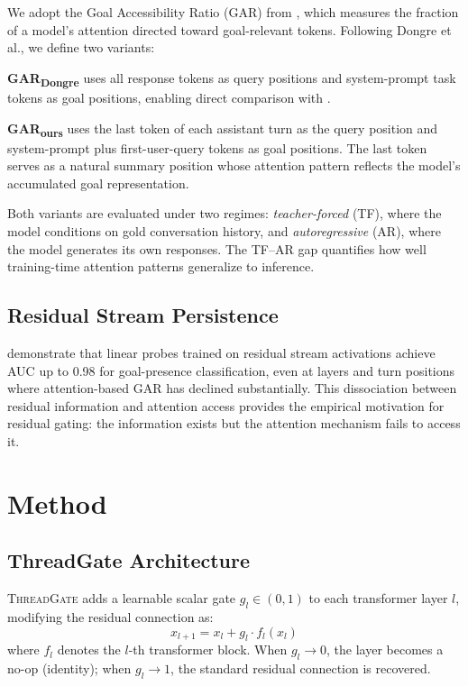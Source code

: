 \documentclass[11pt]{article}
\newcommand{\gar}{\textsc{GAR}}
\newcommand{\garours}{\textsc{GAR}\textsubscript{ours}}
\newcommand{\gardongre}{\textsc{GAR}\textsubscript{Dongre}}
\newcommand{\tg}{\textsc{ThreadGate}}
\begin{document}
We adopt the Goal Accessibility Ratio (\gar{}) from \citet{dongre2026goal}, which measures the fraction of a model's attention directed toward goal-relevant tokens. Following Dongre et al., we define two variants:

\textbf{\gardongre{}} uses all response tokens as query positions and system-prompt task tokens as goal positions, enabling direct comparison with \citet{dongre2026goal}.

\textbf{\garours{}} uses the last token of each assistant turn as the query position and system-prompt plus first-user-query tokens as goal positions. The last token serves as a natural summary position whose attention pattern reflects the model's accumulated goal representation.

Both variants are evaluated under two regimes: \textit{teacher-forced} (TF), where the model conditions on gold conversation history, and \textit{autoregressive} (AR), where the model generates its own responses. The TF--AR gap quantifies how well training-time attention patterns generalize to inference.

\subsection{Residual Stream Persistence}

\citet{dongre2026goal} demonstrate that linear probes trained on residual stream activations achieve AUC up to 0.98 for goal-presence classification, even at layers and turn positions where attention-based \gar{} has declined substantially. This dissociation between residual information and attention access provides the empirical motivation for residual gating: the information exists but the attention mechanism fails to access it.

\section{Method}

\subsection{ThreadGate Architecture}

\tg{} adds a learnable scalar gate $g_l \in (0,1)$ to each transformer layer $l$, modifying the residual connection as:
\begin{equation}
    x_{l+1} = x_l + g_l \cdot f_l(x_l)
\label{eq:gate}
\end{equation}
where $f_l$ denotes the $l$-th transformer block. When $g_l \to 0$, the layer becomes a no-op (identity); when $g_l \to 1$, the standard residual connection is recovered.
\end{document}
